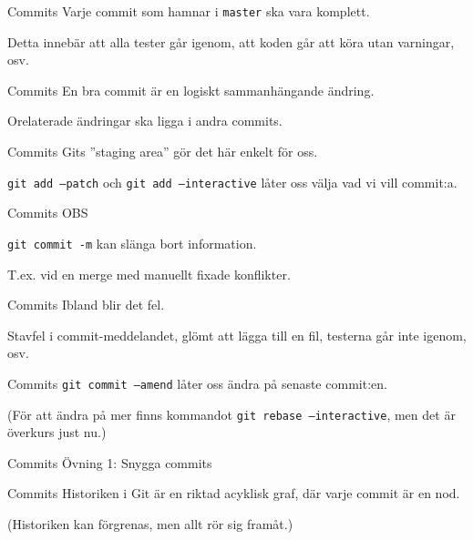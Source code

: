 \documentclass[11pt,xetex]{beamer}
\begin{document}
\begin{frame}{Commits}
  \Large
  Varje commit som hamnar i \texttt{master} ska vara komplett.

  \normalsize
  Detta innebär att alla tester går igenom, att koden går att köra utan
  varningar, osv.
\end{frame}

\begin{frame}{Commits}
  \Large
  En bra commit är en logiskt sammanhängande ändring.

  \normalsize
  Orelaterade ändringar ska ligga i andra commits.
\end{frame}

\begin{frame}{Commits}
  \Large
  Gits ''staging area'' gör det här enkelt för oss.
  \pause

  \texttt{git add --patch} och \texttt{git add
      --interactive} låter oss välja vad vi vill commit:a.
\end{frame}

\begin{frame}{Commits}
  \Huge
  \alert{OBS}

  \Large
  \texttt{git commit -m} kan slänga bort information.

  \normalsize
  T.ex. vid en merge med manuellt fixade konflikter.
\end{frame}

\begin{frame}{Commits}
  \Large
  Ibland blir det fel.
  \pause

  \normalsize
  Stavfel i commit-meddelandet, glömt att lägga till en fil, testerna går inte
  igenom, osv.
\end{frame}

\begin{frame}{Commits}
  \Large
  \texttt{git commit --amend} låter oss ändra på senaste commit:en.

  \normalsize
  (För att ändra på mer finns kommandot \texttt{git rebase
      --interactive}, men det är överkurs just nu.)
\end{frame}

\begin{frame}{Commits}
  \Large
  Övning 1: Snygga commits
\end{frame}

\begin{frame}{Commits}
  \Large
  Historiken i Git är en riktad acyklisk graf, där varje commit är en nod.

  \small
  (Historiken kan förgrenas, men allt rör sig framåt.)
\end{frame}
\end{document}
